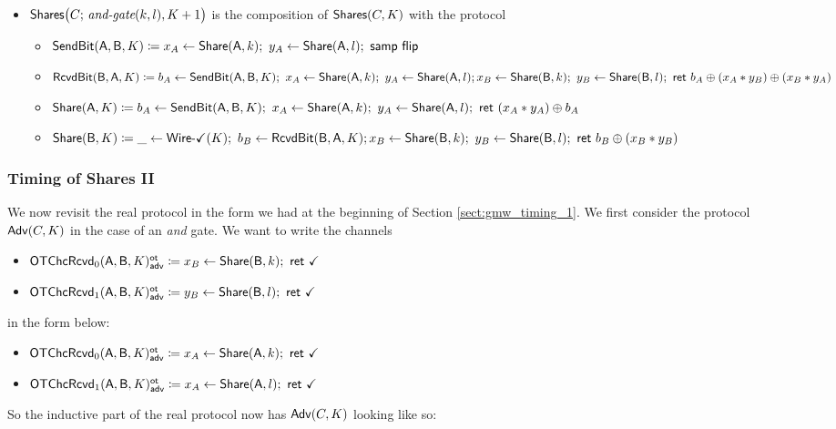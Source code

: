 \begin{itemize}
\item $\mathsf{Shares}\big(C; \, \textit{and-gate}(k,l),K+1\big)$ is the composition of $\mathsf{Shares}(C,K)$ with the protocol
\begin{itemize}
\item $\SendBit(\A,\B,K) \coloneqq x_A \leftarrow \Share(\A,k); \ y_A \leftarrow \Share(\A,l); \ \samp{\flip}$
\item $\mathsf{RcvdBit}(\mathsf{B},\mathsf{A},K) \coloneqq b_A \leftarrow \mathsf{SendBit}(\mathsf{A},\mathsf{B},K); \ x_A \leftarrow \mathsf{Share}(\mathsf{A},k); \ y_A \leftarrow \mathsf{Share}(\mathsf{A},l); \\ x_B \leftarrow \mathsf{Share}(\mathsf{B},k); \ y_B \leftarrow \mathsf{Share}(\mathsf{B},l); \ \mathsf{ret} \ b_A \oplus (x_A * y_B) \oplus (x_B * y_A)$
\item $\mathsf{Share}(\mathsf{A},K) \coloneqq b_A \leftarrow \mathsf{SendBit}(\mathsf{A},\mathsf{B},K); \ x_A \leftarrow \mathsf{Share}(\mathsf{A},k); \ y_A \leftarrow \mathsf{Share}(\mathsf{A},l); \ \mathsf{ret} \ (x_A * y_A) \oplus b_A$
\item $\mathsf{Share}(\mathsf{B},K) \coloneqq \_ \leftarrow \mathsf{Wire}\textsf{-}\checkmark(K); \ b_B \leftarrow \mathsf{RcvdBit}(\mathsf{B},\mathsf{A},K); \\ x_B \leftarrow \mathsf{Share}(\mathsf{B},k); \ y_B \leftarrow \mathsf{Share}(\mathsf{B},l); \ \mathsf{ret} \ b_B \oplus (x_B * y_B)$
\end{itemize}
\end{itemize}

\subsubsection{Timing of Shares II}\label{sect:gmw_timing_2}
We now revisit the real protocol in the form we had at the beginning of Section \ref{sect:gmw_timing_1}. We first consider the protocol $\mathsf{Adv}(C,K)$ in the case of an \emph{and} gate. We want to write the channels
\begin{itemize}
\item {\color{blue} $\mathsf{OTChcRcvd}_0(\mathsf{A},\mathsf{B},K)^{\mathsf{ot}}_{\mathsf{adv}} \coloneqq x_B \leftarrow \mathsf{Share}(\mathsf{B},k); \ \mathsf{ret} \ \checkmark$}
\item {\color{blue} $\mathsf{OTChcRcvd}_1(\mathsf{A},\mathsf{B},K)^{\mathsf{ot}}_{\mathsf{adv}} \coloneqq y_B \leftarrow \mathsf{Share}(\mathsf{B},l); \ \mathsf{ret} \ \checkmark$}
\end{itemize}
in the form below:
\begin{itemize}
\item {\color{blue} $\mathsf{OTChcRcvd}_0(\mathsf{A},\mathsf{B},K)^{\mathsf{ot}}_{\mathsf{adv}} \coloneqq x_A \leftarrow \mathsf{Share}(\mathsf{A},k); \ \mathsf{ret} \ \checkmark$}
\item {\color{blue} $\mathsf{OTChcRcvd}_1(\mathsf{A},\mathsf{B},K)^{\mathsf{ot}}_{\mathsf{adv}} \coloneqq x_A \leftarrow \mathsf{Share}(\mathsf{A},l); \ \mathsf{ret} \ \checkmark$}
\end{itemize}
So the inductive part of the real protocol now has $\mathsf{Adv}(C,K)$ looking like so:

